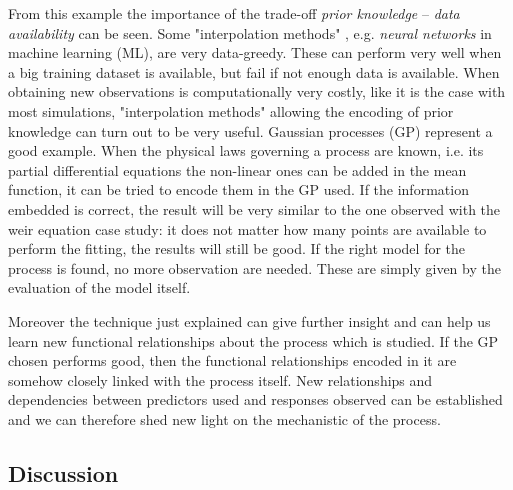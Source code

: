 From this example the importance of the trade-off \emph{prior knowledge} -- \emph{data availability} can be seen.
Some "interpolation methods" , e.g. \emph{neural networks} in machine learning (ML), are very data-greedy.
These can perform very well when a big training dataset is available, but fail if not enough data is available.
When obtaining new observations is computationally very costly, like it is the case with most simulations, "interpolation methods" allowing the encoding of prior knowledge can turn out to be very useful.
Gaussian processes (GP) represent a good example.
When the physical laws governing a process are known, i.e. its partial differential equations  the non-linear ones can be added in the mean function, it can be tried to encode them in the GP used.
If the information embedded is correct, the result will be very similar to the one observed with the weir equation case study: it does not matter how many points are available to perform the fitting, the results will still be good.
If the right model for the process is found, no more observation are needed.
These are simply given by the evaluation of the model itself.

Moreover the technique just explained can give further insight and can help us learn new functional relationships about the process which is studied.
If the GP chosen performs good, then the functional relationships encoded in it are somehow closely linked with the process itself.
New relationships and dependencies between predictors used and responses observed can be established and we can therefore shed new light on the mechanistic of the process.


\subsection{Discussion}





\newpage

